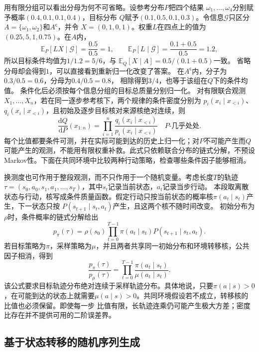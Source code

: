 用有限分组可以看出分母为何不可省略。设参考分布\(P\)把四个结果
\(\omega_1,\ldots,\omega_4\)分别赋予概率\((0.4,0.1,0.1,0.4)\)，目标分布
\(Q\)赋予\((0.1,0.5,0.1,0.3)\)。令信息\(\mathcal{G}\)只区分
\(A=\{\omega_1,\omega_2\}\)和\(A^{\mathsf c}\)，并令
\(X=(0,1,0,1)\)。权重\(L\)在四点上的值为\((0.25,5,1,0.75)\)。在\(A\)内，
\[
  \mathbb{E}_P[LX\mid\mathcal{G}]
  =\frac{0.5}{0.5}=1,\qquad
  \mathbb{E}_P[L\mid\mathcal{G}]
  =\frac{0.1+0.5}{0.5}=1.2,
\]
所以目标条件均值为\(1/1.2=5/6\)，与
\(\mathbb{E}_Q[X\mid A]=0.5/(0.1+0.5)\)一致。
省略分母却会得到\(1\)，可以直接看到重新归一化改变了答案。
在\(A^{\mathsf c}\)内，分子为\(0.3/0.5=0.6\)，分母为\(0.4/0.5=0.8\)，
相除得到\(3/4\)，也等于该组在\(Q\)下的条件均值。
条件化后必须按每个信息分组的目标总质量分别归一化。
对有限联合观测\(X_1,\ldots,X_n\)，若在同一逐步参考核下，两个规律的条件密度分别为
\(p_i(x_i\mid x_{<i})\)、\(q_i(x_i\mid x_{<i})\)，且初始及逐步目标核对来源核绝对连续，则
\[
\frac{\mathrm dQ}{\mathrm dP}(x_{1:n})
=\prod_{i=1}^n
\frac{q_i(x_i\mid x_{<i})}{p_i(x_i\mid x_{<i})}
\quad P\text{-几乎处处}.
\]
每个比值都要条件可测，并在实际可能到达的历史上归一化；对\(P\)不可能产生而\(Q\)可能产生的观测，不能用有限权重补救。此式只依赖联合分布的链式分解，不预设Markov性。下面在共同环境中比较两种行动策略，检查哪些条件因子能够相消。

换测度也可作用于整段观测，而不只作用于一个随机变量。考虑长度\(T\)的轨迹
\(\tau=(s_0,a_0,s_1,a_1,\ldots,s_T)\)，其中\(s_t\)记录当前状态，\(a_t\)记录当步行动。
本段取离散状态与行动，核写成条件质量函数。假定行动只按当前状态的概率核\(\pi(a_t\mid s_t)\)产生，下一状态只按
\(P(s_{t+1}\mid s_t,a_t)\)产生，且这两个核不随时间改变。
初始分布为\(\rho\)时，条件概率的链式分解给出
\[ p_\pi(\tau)
  =\rho(s_0)\prod_{t=0}^{T-1}\pi(a_t\mid s_t)P(s_{t+1}\mid s_t,a_t). \]
若目标策略为\(\pi\)，采样策略为\(\mu\)，并且两者共享同一初始分布和环境转移核，公共因子相消，得到
\begin{equation}
  \frac{p_\pi(\tau)}{p_\mu(\tau)}
  =
  \prod_{t=0}^{T-1}
  \frac{\pi(a_t\mid s_t)}{\mu(a_t\mid s_t)}.
  \label{eq:probability-trajectory-likelihood-ratio}
\end{equation}
该公式要求目标轨迹分布绝对连续于采样轨迹分布。具体地说，只要\(\pi(a\mid s)>0\)，在可能到达的状态上就需要\(\mu(a\mid s)>0\)。共同环境假设若不成立，转移核的比值也必须保留。即使每一步
比值有限，长轨迹连乘仍可能产生极大方差；密度比存在并不提供可用的二阶误差界。

\subsection{基于状态转移的随机序列生成}

